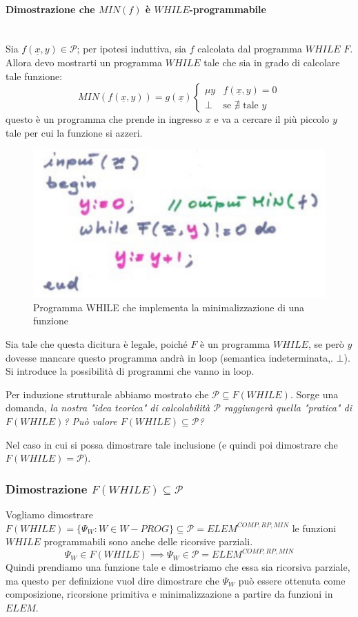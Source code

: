 \documentclass{article}
\begin{document}
\paragraph{Dimostrazione che $MIN(f)$ è $WHILE$-programmabile}\mbox{}\\
Sia $f(\underline{x},y)\in\mathcal{P}$; per ipotesi induttiva, sia $f$ calcolata dal
programma $WHILE$ $F$. Allora devo mostrarti un programma $WHILE$ tale che sia in grado
di calcolare tale funzione:
\[
    MIN(f(\underline{x},y))=g(\underline{x})
    \begin{cases}
        \mu y & f(\underline{x},y)=0             \\
        \bot  & \text{se }\nexists\text{ tale }y
    \end{cases}
\]
questo è un programma che prende in ingresso $x$ e va a cercare il più piccolo $y$
tale per cui la funzione si azzeri.
\begin{figure}[H]
    \centering
    \includegraphics[scale=0.5]{images/while-prog-min.png}
    \caption{Programma WHILE che implementa la minimalizzazione di una funzione}
\end{figure}
Sia tale che questa dicitura è legale, poiché $F$ è un programma $WHILE$, se però
$y$ dovesse mancare questo programma andrà in loop (semantica indeterminata,. $\bot$). Si introduce
la possibilità di programmi che vanno in loop.

Per induzione strutturale abbiamo mostrato che $\mathcal{P}\subseteq F(WHILE)$. Sorge una
domanda, \textit{la nostra "idea teorica" di calcolabilità $\mathcal{P}$ raggiungerà
    quella "pratica" di $F(WHILE)$? Può valore $F(WHILE)\subseteq\mathcal{P}$?}

Nel caso in cui si possa dimostrare tale inclusione (e quindi poi dimostrare che $F(WHILE)=\mathcal{P}$).

\subsubsection{Dimostrazione $F(WHILE)\subseteq\mathcal{P}$}
Vogliamo dimostrare $F(WHILE)=\{\Psi_W : W\in W-PROG\}\subseteq\mathcal{P}=ELEM^{COMP,RP,MIN}$
le funzioni $WHILE$ programmabili sono anche delle ricorsive parziali.
$$\Psi_W\in F(WHILE)\implies\Psi_W\in\mathcal{P}=ELEM^{COMP,RP,MIN}$$
Quindi prendiamo una funzione tale e dimostriamo che essa sia ricorsiva parziale, ma questo
per definizione vuol dire dimostrare che $\Psi_W$ può essere ottenuta come composizione,
ricorsione primitiva e minimalizzazione a partire da funzioni in $ELEM$.
\end{document}
